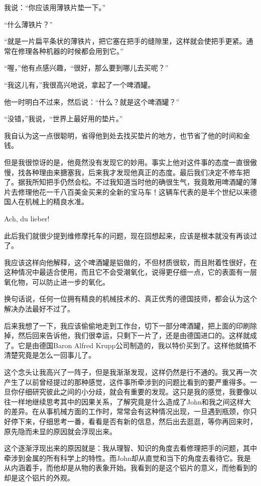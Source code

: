 \documentclass[UTF8]{article}
\begin{document}
\par 我说：“你应该用薄铁片垫一下。”
\par “什么薄铁片？”
\par “就是一片扁平条状的薄铁片，把它塞在把手的缝隙里，这样就会使把手更紧。通常在修理各种机器的时候都会用到它。”
\par “喔，”他有点感兴趣，“很好，那么要到哪儿去买呢？”
\par “我这儿有，”我很高兴地说，拿起了一个啤酒罐。
\par 他一时明白不过来，然后说：“什么？就是这个啤酒罐？”
\par “没错，”我说，“世界上最好用的垫片。”
\par 我自认为这一点很聪明，省得他到处去找买垫片的地方，也节省了他的时间和金钱。
\par 但是我很惊讶的是，他竟然没有发现它的妙用。事实上他对这件事的态度一直很傲慢，找各种理由来搪塞我，后来我才发现他真正的态度。最后我们决定不修车把了。据我所知把手仍然会松。不过我知道当时他的确很生气，我竟敢用啤酒罐的薄片去修理他花一千八百美金买来的全新的宝马车！这辆车代表的是半个世纪以来德国人在机械上的精良水准。
\par Ach, du lieber!
\par 此后我们就很少提到维修摩托车的问题，现在回想起来，应该是根本就没有再谈过了。
\par 我应该这样向他解释，这个啤酒罐是铝做的，不但材质很软，而且附着性很好，在这种情况中最适合使用，而且它不会受潮氧化，说得更仔细一点，它的表面有一层氧化物，可以防止进一步的氧化。
\par 换句话说，任何一位拥有精良的机械技术的、真正优秀的德国技师，都会认为这个解决办法最好不过了。
\par 后来我想了一下，我应该偷偷地走到工作台，切下一部分啤酒罐，把上面的印刷除掉，然后回来告诉他，我们很幸运，只剩下一片了，还是由德国进口的。这样就成了。它是由德国Baron Alfred Krupp公司制造的，我以特价买到了。这样他就搞不清楚究竟是怎么一回事儿了。
\par 这个念头让我高兴了一阵子，但是我渐渐发现，这样仍然是行不通的。我又再一次产生了以前曾经提过的那种感觉，这件事所牵涉到的问题比看到的要严重得多。一旦你仔细研究彼此之间的小分歧，就会有重要的发现。这只是我的感觉，我要像以往一样地继续思考其中的因果关系，了解究竟是什么造成了John和我之间这样大的差异。在从事机械方面的工作时，常常会有这种情况出现，一旦遇到瓶颈，你只好停下来，仔细思考一番，看看是否有新的信息，然后出去逛逛，等你再回来时，原先隐而未显的原因就会浮现出来。
\par 这个逐渐浮现出来的原因就是：我从理智、知识的角度去看修理把手的问题，其中牵涉到金属的所有科学上的特性。而John却从直觉和当下的角度去看待它。我是从内涵着手，而他却是从物的表象开始。我看到的是这个铝片的意义，而他看到的却是这个铝片的外观。
\end{document}

